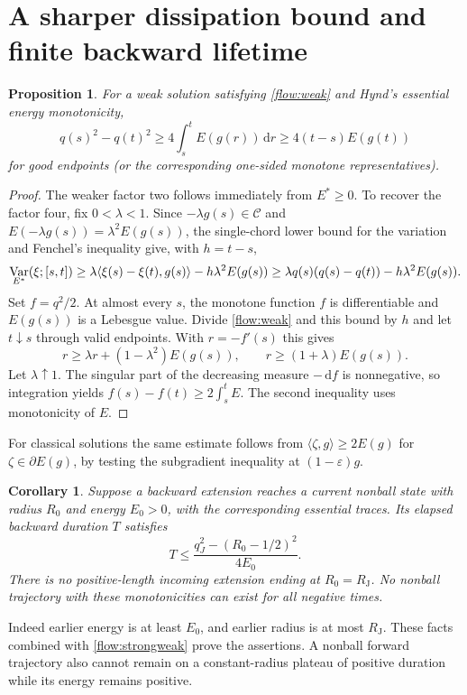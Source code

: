 \documentclass[11pt]{article}
\newtheorem{proposition}[theorem]{Proposition}
\newtheorem{corollary}[theorem]{Corollary}
\theoremstyle{remark}\newtheorem{remark}[theorem]{Remark}
\newcommand{\RJ}{R_{\mathrm J}}
\newcommand{\dd}{\,\mathrm d}
\newcommand{\C}{\mathcal C}
\begin{document}
\section{A sharper dissipation bound and finite backward lifetime}
\begin{proposition}\label{flow:dissipation}
For a weak solution satisfying \eqref{flow:weak} and Hynd's essential energy monotonicity,
\begin{equation}\label{flow:strongweak}
 q(s)^2-q(t)^2\geq4\int_s^t E(g(r))\dd r
 \geq4(t-s)E(g(t))
\end{equation}
for good endpoints (or the corresponding one-sided monotone representatives).
\end{proposition}
\begin{proof}
The weaker factor two follows immediately from $E^*\geq0$. To recover the factor four, fix $0<\lambda<1$. Since $-\lambda g(s)\in\C$ and $E(-\lambda g(s))=\lambda^2E(g(s))$, the single-chord lower bound for the variation and Fenchel's inequality give, with $h=t-s$,
\[
 \mathop{\rm Var}_{E^*}(\xi;[s,t])
 \geq\lambda\langle\xi(s)-\xi(t),g(s)\rangle-h\lambda^2E(g(s))
 \geq\lambda q(s)(q(s)-q(t))-h\lambda^2E(g(s)).
\]
Set $f=q^2/2$. At almost every $s$, the monotone function $f$ is differentiable and $E(g(s))$ is a Lebesgue value. Divide \eqref{flow:weak} and this bound by $h$ and let $t\downarrow s$ through valid endpoints. With $r=-f'(s)$ this gives
\[
 r\geq\lambda r+(1-\lambda^2)E(g(s)),\qquad
 r\geq(1+\lambda)E(g(s)).
\]
Let $\lambda\uparrow1$. The singular part of the decreasing measure $-\dd f$ is nonnegative, so integration yields
$f(s)-f(t)\geq2\int_s^t E$. The second inequality uses monotonicity of $E$.
\end{proof}
For classical solutions the same estimate follows from
$\langle\zeta,g\rangle\geq2E(g)$ for $\zeta\in\partial E(g)$, by testing the subgradient inequality at $(1-\varepsilon)g$.

\begin{corollary}\label{flow:backtime}
Suppose a backward extension reaches a current nonball state with radius $R_0$ and energy $E_0>0$, with the corresponding essential traces. Its elapsed backward duration $T$ satisfies
\begin{equation}\label{flow:timebound}
 T\leq\frac{q_J^2-(R_0-1/2)^2}{4E_0}.
\end{equation}
There is no positive-length incoming extension ending at $R_0=\RJ$. No nonball trajectory with these monotonicities can exist for all negative times.
\end{corollary}
Indeed earlier energy is at least $E_0$, and earlier radius is at most $\RJ$. These facts combined with \eqref{flow:strongweak} prove the assertions. A nonball forward trajectory also cannot remain on a constant-radius plateau of positive duration while its energy remains positive.
\end{document}
